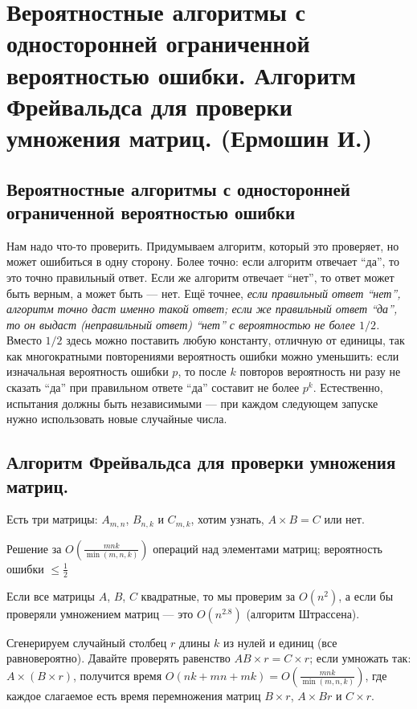 \hypertarget{Freivalds}{}
\section{Вероятностные алгоритмы с односторонней ограниченной вероятностью ошибки. Алгоритм Фрейвальдса для проверки умножения матриц. (Ермошин И.)}

\subsection{Вероятностные алгоритмы с односторонней ограниченной вероятностью ошибки}

Нам надо что-то проверить. Придумываем алгоритм, который это проверяет, но может ошибиться в одну сторону. Более точно: если алгоритм отвечает ``да'', то это точно правильный ответ. Если же алгоритм отвечает ``нет'', то ответ может быть верным, а может быть --- нет. Ещё точнее, \emph{если правильный ответ ``нет'', алгоритм точно даст именно такой ответ; если же правильный ответ ``да'', то он выдаст (неправильный ответ) ``нет'' с вероятностью не более $1/2$.} Вместо $1/2$ здесь можно поставить любую константу, отличную от единицы, так как многократными повторениями вероятность ошибки можно уменьшить: если изначальная вероятность ошибки  $p$, то после $k$ повторов вероятность ни разу не сказать ``да'' при правильном ответе ``да'' составит не более $p^k$. Естественно, испытания должны быть независимыми --- при каждом следующем запуске нужно использовать новые случайные числа.

\subsection{Алгоритм Фрейвальдса для проверки умножения матриц.}

Есть три матрицы: $A_{m,n}$, $B_{n,k}$ и $C_{m,k}$, хотим узнать, $A\times B=C$ или нет.

\begin{algodescription}{Решение за $O\left(\frac{mnk}{\min(m,n,k)}\right)$ операций над элементами матриц; вероятность ошибки $\le\frac{1}{2}$}

\begin{nb*}Если все матрицы $A$, $B$, $C$ квадратные, то мы проверим за $O(n^2)$, а если бы проверяли умножением матриц --- это $O(n^{2.8})$ (алгоритм Штрассена).
\end{nb*}

Сгенерируем случайный столбец $r$ длины $k$ из нулей и единиц (все равновероятно). Давайте проверять равенство $AB\times r=C\times r$; если умножать так: $A\times (B\times r)$, получится время $O(nk+mn+mk)=O\left(\frac{mnk}{\min(m,n,k)}\right)$, где каждое слагаемое есть время перемножения матриц $B\times r$, $A \times Br$ и $C\times r$.
\end{algodescription}

